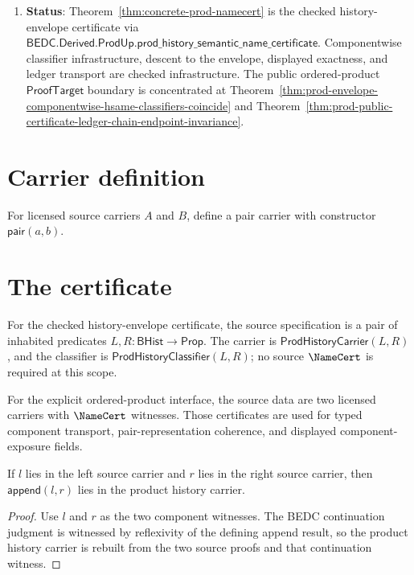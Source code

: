 \begin{enumerate}
  \item \textbf{Status}: Theorem~\ref{thm:concrete-prod-namecert} is the checked history-envelope certificate via $\mathsf{BEDC.Derived.ProdUp.prod\_history\_semantic\_name\_certificate}$. Componentwise classifier infrastructure, descent to the envelope, displayed exactness, and ledger transport are checked infrastructure. The public ordered-product $\mathsf{ProofTarget}$ boundary is concentrated at Theorem~\ref{thm:prod-envelope-componentwise-hsame-classifiers-coincide} and Theorem~\ref{thm:prod-public-certificate-ledger-chain-endpoint-invariance}.
\end{enumerate}

\section{Carrier definition}

\begin{definition}
\label{def:prod-carrier}
For licensed source carriers \(A\) and \(B\), define a pair carrier with constructor \(\mathsf{pair}(a,b)\).
\end{definition}

\section{The certificate}

\begin{definition}
\label{def:prod-source-specification}
For the checked history-envelope certificate, the source specification is a
pair of inhabited predicates $L,R:\mathsf{BHist}\to\mathsf{Prop}$. The carrier
is $\mathsf{ProdHistoryCarrier}(L,R)$, and the classifier is
$\mathsf{ProdHistoryClassifier}(L,R)$; no source $\NameCert$ is required at
this scope.

For the explicit ordered-product interface, the source data are two licensed
carriers with $\NameCert$ witnesses. Those certificates are used for typed
component transport, pair-representation coherence, and displayed component-exposure fields.
\end{definition}

\begin{theorem}
\label{thm:prod-history-carrier-append-intro}
If \(l\) lies in the left source carrier and \(r\) lies in the right source
carrier, then \(\mathsf{append}(l,r)\) lies in the product history carrier.
\end{theorem}
\begin{proof}
Use \(l\) and \(r\) as the two component witnesses. The BEDC continuation
judgment is witnessed by reflexivity of the defining append result, so the
product history carrier is rebuilt from the two source proofs and that
continuation witness.
\end{proof}

